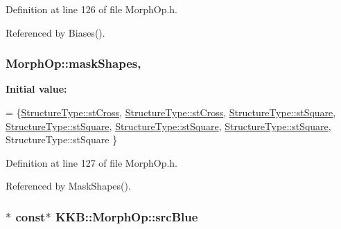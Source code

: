 Definition at line 126 of file Morph\+Op.\+h.



Referenced by Biases().

\subsubsection[{\texorpdfstring{mask\+Shapes}{maskShapes}}]{ Morph\+Op\+::mask\+Shapes\hspace{0.3cm}{\ttfamily [static]}, {\ttfamily [protected]}}\hypertarget{class_k_k_b_1_1_morph_op_a7e8ac61b2b389a4b644566daee2972d4}{}\label{class_k_k_b_1_1_morph_op_a7e8ac61b2b389a4b644566daee2972d4}
{\bfseries Initial value\+:}
\begin{DoxyCode}
= \{\hyperlink{class_k_k_b_1_1_morph_op_a09e4aff7e81327849855ff72082d85b3afe6b37e55346afd2a8606e81a7982dc5}{StructureType::stCross},   
                                        \hyperlink{class_k_k_b_1_1_morph_op_a09e4aff7e81327849855ff72082d85b3afe6b37e55346afd2a8606e81a7982dc5}{StructureType::stCross},   
                                        \hyperlink{class_k_k_b_1_1_morph_op_a09e4aff7e81327849855ff72082d85b3a04505973fd476144464695ac6483e490}{StructureType::stSquare},  
                                        \hyperlink{class_k_k_b_1_1_morph_op_a09e4aff7e81327849855ff72082d85b3a04505973fd476144464695ac6483e490}{StructureType::stSquare},  
                                        \hyperlink{class_k_k_b_1_1_morph_op_a09e4aff7e81327849855ff72082d85b3a04505973fd476144464695ac6483e490}{StructureType::stSquare},  
                                        \hyperlink{class_k_k_b_1_1_morph_op_a09e4aff7e81327849855ff72082d85b3a04505973fd476144464695ac6483e490}{StructureType::stSquare},  
                                        StructureType::stSquare   
                                       \}
\end{DoxyCode}


Definition at line 127 of file Morph\+Op.\+h.



Referenced by Mask\+Shapes().

\subsubsection[{\texorpdfstring{src\+Blue}{srcBlue}}]{$\ast$ const$\ast$ K\+K\+B\+::\+Morph\+Op\+::src\+Blue\hspace{0.3cm}{\ttfamily [protected]}}\hypertarget{class_k_k_b_1_1_morph_op_ad11edf2de07634c4c68df9a2e74cfd6c}{}\label{class_k_k_b_1_1_morph_op_ad11edf2de07634c4c68df9a2e74cfd6c}



